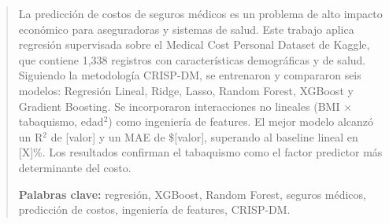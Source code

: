 \begin{abstract}
La predicción de costos de seguros médicos es un problema de alto impacto
económico para aseguradoras y sistemas de salud. Este trabajo aplica
regresión supervisada sobre el Medical Cost Personal Dataset de Kaggle,
que contiene 1,338 registros con características demográficas y de salud.
Siguiendo la metodología CRISP-DM, se entrenaron y compararon seis modelos:
Regresión Lineal, Ridge, Lasso, Random Forest, XGBoost y Gradient Boosting.
Se incorporaron interacciones no lineales (BMI $\times$ tabaquismo, edad$^2$) como
ingeniería de features. El mejor modelo alcanzó un R$^2$ de [valor] y un MAE
de \$[valor], superando al baseline lineal en [X]\%. Los resultados
confirman el tabaquismo como el factor predictor más determinante del costo.

\textbf{Palabras clave:} regresión, XGBoost, Random Forest, seguros médicos,
predicción de costos, ingeniería de features, CRISP-DM.
\end{abstract}
